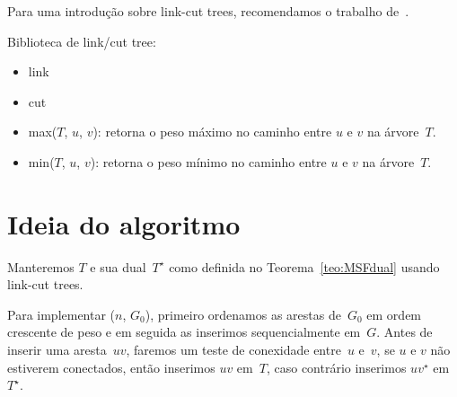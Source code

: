Para uma introdução sobre link-cut trees, recomendamos o trabalho de~\cite{linkcuttree}.

Biblioteca de link/cut tree:
\begin{itemize}
\item link
\item cut
\item max($T$, $u$, $v$): retorna o peso máximo no caminho entre $u$ e $v$ na árvore~$T$.
\item min($T$, $u$, $v$): retorna o peso mínimo no caminho entre $u$ e $v$ na árvore~$T$.
\end{itemize}

\section{Ideia do algoritmo}
Manteremos $T$ e sua dual~$T^\star$ como definida no Teorema~\ref{teo:MSFdual} usando link-cut trees.

Para implementar \MSFCreate($n$, $G_0$), primeiro ordenamos as arestas de~$G_0$ em ordem crescente de peso e em seguida as inserimos sequencialmente em~$G$.
Antes de inserir uma aresta~$uv$, faremos um teste de conexidade entre~$u$ e~$v$, se $u$ e $v$ não estiverem conectados, então inserimos $uv$ em~$T$, caso contrário inserimos $uv^\star$ em~$T^\star$.






